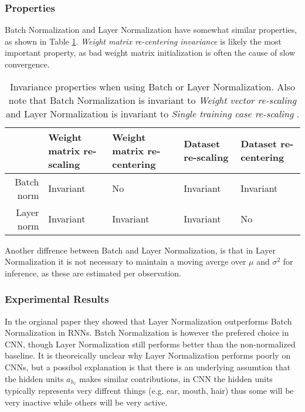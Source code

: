 \subsubsection{Properties}

Batch Normalization and Layer Normalization have somewhat similar properties, as shown in Table \ref{table:convergence:layer-norm:properties}. \textit{Weight matrix re-centering invariance} is likely the most important property, as bad weight matrix initialization is often the cause of slow convergence. 

\begin{table}[H]
\centering
\begin{tabular}{r|p{2cm} p{2cm} p{2cm} p{2cm}}
	           & Weight matrix re-scaling & Weight matrix re-centering & Dataset re-scaling& Dataset re-centering \\ \hline
	Batch norm & Invariant & No & Invariant & Invariant \\
	Layer norm & Invariant & Invariant & Invariant & No \\
\end{tabular}
\caption{Invariance properties when using Batch or Layer Normalization. Also note that Batch Normalization is invariant to \textit{Weight vector re-scaling} and Layer Normalization is invariant to \textit{Single training case re-scaling} \cite{layer-normalization}.}
\label{table:convergence:layer-norm:properties}
\end{table}

Another diffrence between Batch and Layer Normalization, is that in Layer Normalization it is not necessary to maintain a moving averge over $\mu$ and $\sigma^2$ for inference, as these are estimated per observation.

\subsubsection{Experimental Results}

In the orgianal paper \cite{layer-normalization} they showed that Layer Normalization outperforms Batch Normalization in RNNs. Batch Normalization is however the prefered choice in CNN, though Layer Normalization still performs better than the non-normalized baseline. It is theoreically unclear why Layer Normalization performs poorly on CNNs, but a possibol explanation is that there is an underlying assumtion that the hidden units $a_{h_\ell}$ makes similar contributions, in CNN the hidden units typically represents very diffrent things (e.g. ear, mouth, hair) thus some will be very inactive while others will be very active.

